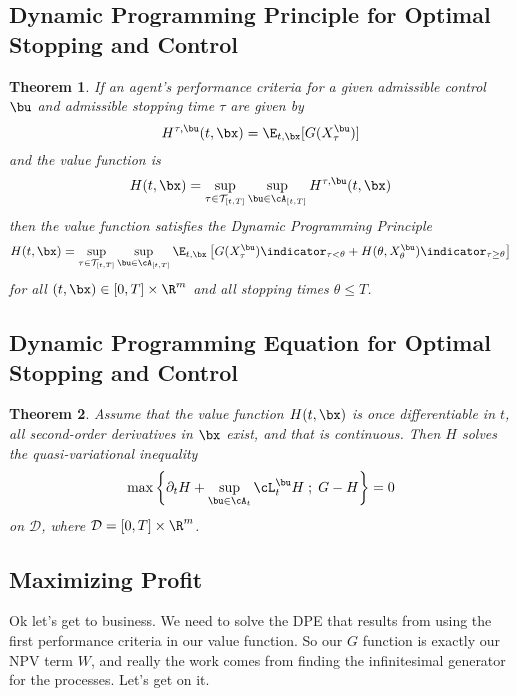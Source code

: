\documentclass[12pt]{article}
\newtheorem{theorem}{Theorem}
\begin{document}
\subsection*{Dynamic Programming Principle for Optimal Stopping and Control}
\begin{theorem}
If an agent's performance criteria for a given admissible control $\bu$ and admissible stopping time $\tau$ are given by
\[ H^{\tau, \bu}(t,\bx) = \E_{t,\bx} [ G (X^{\bu}_\tau)] \]
and the value function is
\[ H(t,\bx) = \sup\limits_{\tau \in \mathcal{T}_{[t,T]}} \sup\limits_{\bu \in \cA_{[t,T]}} H^{\tau, \bu}(t,\bx) \]
then the value function satisfies the Dynamic Programming Principle
\begin{equation}
\label{eq:thmDPP}
H(t,\bx) = \sup\limits_{\tau \in \mathcal{T}_{[t,T]}} \sup\limits_{\bu \in \cA_{[t,T]}} \E_{t,\bx} \left[ G (X^{\bu}_\tau) \indicator_{\tau<\theta} + H(\theta, X^{\bu}_\theta)\indicator_{\tau \geq \theta} \right]
\end{equation}
for all $(t,\bx) \in [0,T] \times \R^m$ and all stopping times $\theta \leq T$.
\end{theorem}

\subsection*{Dynamic Programming Equation for Optimal Stopping and Control}
\begin{theorem}
Assume that the value function $H(t,\bx)$ is once differentiable in $t$, all second-order derivatives in $\bx$ exist, and that  is continuous. Then $H$ solves the quasi-variational inequality
\begin{equation}
\label{eq:thmDPE}
\max \left\lbrace \partial_t H + \sup \limits_{\bu \in \cA_t} \cL^{\bu}_t H \; ; \; G - H \right\rbrace = 0
\end{equation}
on $\mathcal{D}$, where $\mathcal{D} = [0,T] \times \R^m$.
\end{theorem}

\subsection*{Maximizing Profit}
Ok let's get to business. We need to solve the DPE that results from using the first performance criteria in our value function. So our $G$ function is exactly our NPV term $W$, and really the work comes from finding the infinitesimal generator for the processes. Let's get on it.
\end{document}
